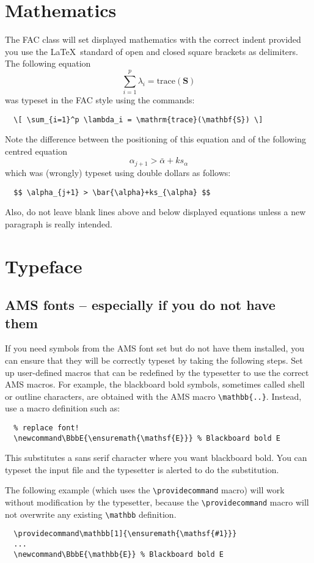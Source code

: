 \documentclass{fac}
\begin{document}
\section{Mathematics}

The FAC class will set displayed mathematics with the correct indent
provided you use the \LaTeX\ standard of open and closed square brackets 
as delimiters. The following equation
  \[ \sum_{i=1}^p \lambda_i = \mathrm{trace}(\mathbf{S}) \]
was typeset in the FAC style using the commands:
\begin{verbatim}
  \[ \sum_{i=1}^p \lambda_i = \mathrm{trace}(\mathbf{S}) \]
\end{verbatim}
Note the difference between the positioning of this equation and of
the following centred equation
  $$ \alpha_{j+1} > \bar{\alpha}+ks_{\alpha} $$
which was (wrongly) typeset using double dollars as follows:
\begin{verbatim}
  $$ \alpha_{j+1} > \bar{\alpha}+ks_{\alpha} $$
\end{verbatim}
Also, do not leave blank lines above and below displayed equations
unless a new paragraph is really intended.

\section{Typeface}

\subsection{AMS fonts -- especially if you do not have them}

If you need symbols from the AMS font set but do not have them installed,
you can ensure that they will be correctly typeset by taking the following
steps.
Set up user-defined macros that can be redefined by the typesetter to use
the correct AMS macros. For example, the blackboard bold symbols,
sometimes called shell or outline characters, are obtained with the AMS
macro \verb"\mathbb{..}". Instead, use a macro definition such as:
%
\begin{verbatim}
  % replace font!
  \newcommand\BbbE{\ensuremath{\mathsf{E}}} % Blackboard bold E
\end{verbatim}
%
This substitutes a sans serif character where you want blackboard
bold. You can typeset the input file and the typesetter is alerted to do the
substitution.

The following example (which uses the \verb"\providecommand" macro) will work
without modification by the typesetter, because the \verb"\providecommand"
macro will not overwrite any existing \verb"\mathbb" definition.
%
\begin{verbatim}
  \providecommand\mathbb[1]{\ensuremath{\mathsf{#1}}}
  ...
  \newcommand\BbbE{\mathbb{E}} % Blackboard bold E
\end{verbatim}
\end{document}
